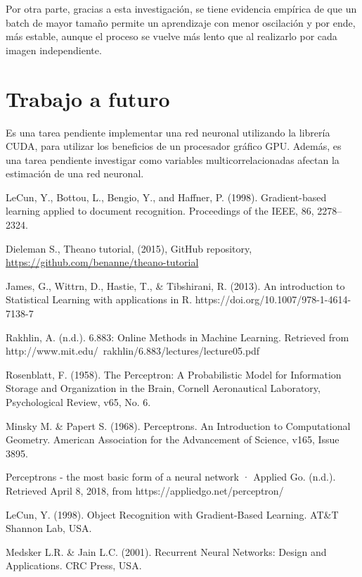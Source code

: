 \documentclass[journal]{IEEEtran}
\begin{document}
Por otra parte, gracias a esta investigación, se tiene evidencia empírica de que un batch de mayor tamaño permite un aprendizaje con menor oscilación y por ende, más estable, aunque el proceso se vuelve más lento que al realizarlo por cada imagen independiente.


\section{Trabajo a futuro}

Es una tarea pendiente implementar una red neuronal utilizando la librería CUDA, para utilizar los beneficios de un procesador gráfico GPU. Además, es una tarea pendiente investigar como variables multicorrelacionadas afectan la estimación de una red neuronal.

\ifCLASSOPTIONcaptionsoff
  \newpage
\fi



\begin{thebibliography}{5}

LeCun, Y., Bottou, L., Bengio, Y., and Haffner, P. (1998). Gradient-based learning applied to document recognition. Proceedings of the IEEE, 86, 2278–2324.

Dieleman S., Theano tutorial, (2015), GitHub repository, \url{https://github.com/benanne/theano-tutorial}

James, G., Wittrn, D., Hastie, T., \& Tibshirani, R. (2013). An introduction to Statistical Learning with applications in R. https://doi.org/10.1007/978-1-4614-7138-7

Rakhlin, A. (n.d.). 6.883: Online Methods in Machine Learning. Retrieved from http://www.mit.edu/~rakhlin/6.883/lectures/lecture05.pdf

Rosenblatt, F. (1958). The Perceptron: A Probabilistic Model for Information Storage and Organization in the Brain, Cornell Aeronautical Laboratory, Psychological Review, v65, No. 6.

Minsky M. \& Papert S. (1968). Perceptrons. An Introduction to Computational Geometry. American Association for the Advancement of Science, v165, Issue 3895.

Perceptrons - the most basic form of a neural network · Applied Go. (n.d.). Retrieved April 8, 2018, from https://appliedgo.net/perceptron/

LeCun, Y. (1998). Object Recognition with Gradient-Based Learning. AT\&T Shannon Lab, USA.
 
Medsker L.R. \& Jain L.C. (2001). Recurrent Neural Networks: Design and Applications. CRC Press, USA.


\end{thebibliography}
\end{document}
